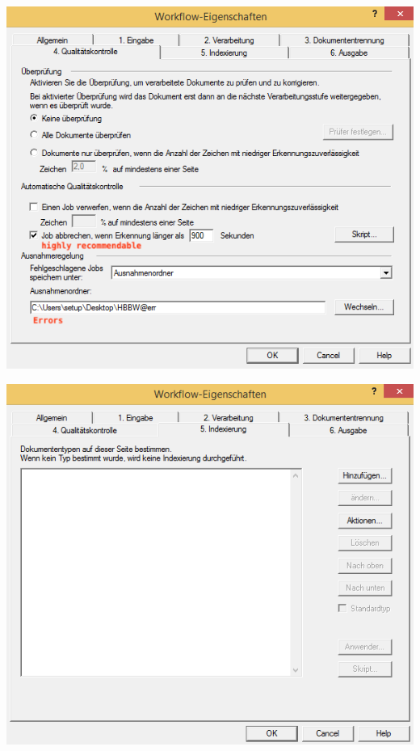 \begin{minipage}{0.4\textwidth}
\begin{center}
\includegraphics[scale=0.42]{4_qualitaetskontrolle.png}
\end{center}
\end{minipage}
\begin{minipage}{0.4\textwidth}
\begin{center}
\includegraphics[scale=0.42]{5_indexierung.png}
\end{center}
\end{minipage}



